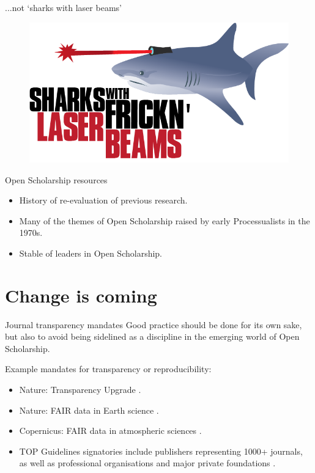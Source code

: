 \documentclass[aspectratio=169, 11pt]{beamer} %
\begin{document}
\begin{frame}{...not `sharks with laser beams'}
 \begin{figure}[H]
    \centering
        \includegraphics[height=.75\textheight]{figures/Sharks-Lasers.png}
        \label{fig:sharks}
 \end{figure}
\end{frame}

\begin{frame}{Open Scholarship resources}
    \begin{itemize}[label=\textbullet]
        \item History of re-evaluation of previous research.
        \item Many of the themes of Open Scholarship raised by early Processualists in the 1970s. \cite{Hole1973-cy} 
        \item Stable of leaders in Open Scholarship. \cite{Kansa2010-qx, Kintigh2006-wa, Marwick2017-bz}
    \end{itemize}
\end{frame}

\section{Change is coming}

\begin{frame}{Journal transparency mandates}
  Good practice should be done for its own sake, but also to avoid being sidelined as a discipline in the emerging world of Open Scholarship. \par
  Example mandates for transparency or reproducibility:
    \begin{itemize}[label=\textbullet]
        \item Nature: Transparency Upgrade \cite{Nature2017-lq}.
        \item Nature: FAIR data in Earth science \cite{Nature2019-ng}.
        \item Copernicus: FAIR data in atmospheric sciences \cite{Van_Edig2018-bu}.
        \item TOP Guidelines signatories include publishers representing 1000+ journals, as well as professional organisations and major private foundations  \cite{Cos2019-mr}.
    \end{itemize}
\end{frame}
\end{document}
